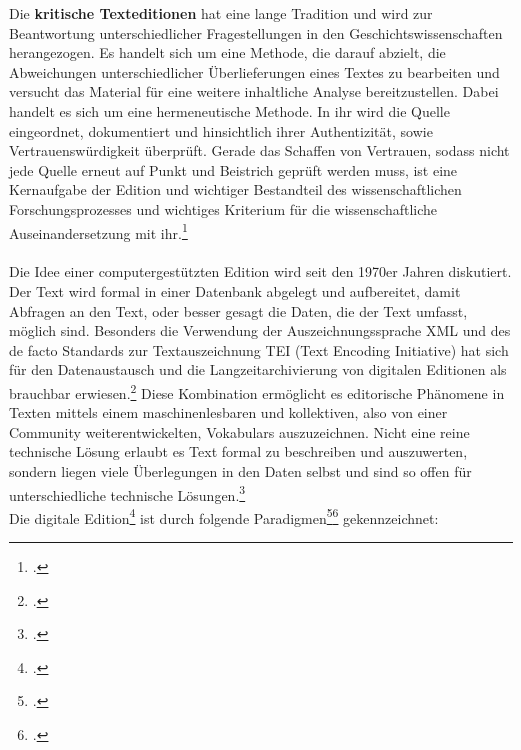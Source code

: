 \documentclass[12pt,a4paper]{article}
\begin{document}
Die \textbf{kritische Texteditionen} hat eine lange Tradition und wird zur Beantwortung unterschiedlicher Fragestellungen in den Geschichtswissenschaften herangezogen. Es handelt sich um eine Methode, die darauf abzielt, die Abweichungen unterschiedlicher Überlieferungen eines Textes zu bearbeiten und versucht das Material für eine weitere inhaltliche Analyse bereitzustellen. Dabei handelt es sich um eine hermeneutische Methode. In ihr wird die Quelle eingeordnet, dokumentiert und hinsichtlich ihrer Authentizität, sowie Vertrauenswürdigkeit überprüft. Gerade das Schaffen von Vertrauen, sodass nicht jede Quelle erneut auf Punkt und Beistrich geprüft werden muss, ist eine Kernaufgabe der Edition und wichtiger Bestandteil des wissenschaftlichen Forschungsprozesses und wichtiges Kriterium für die wissenschaftliche Auseinandersetzung mit ihr.\footcite[][S.101-144]{aumann1999digital}
\\
\\
Die Idee einer computergestützten Edition wird seit den 1970er Jahren diskutiert. Der Text wird formal in einer Datenbank abgelegt und aufbereitet, damit Abfragen an den Text, oder besser gesagt die Daten, die der Text umfasst, möglich sind. Besonders die Verwendung der Auszeichnungssprache XML und des de facto Standards zur Textauszeichnung TEI (Text Encoding Initiative) hat sich für den Datenaustausch und die Langzeitarchivierung von digitalen Editionen als brauchbar erwiesen.\footcite{burnard2014text} Diese Kombination ermöglicht es editorische Phänomene in Texten mittels einem maschinenlesbaren und kollektiven, also von einer Community weiterentwickelten, Vokabulars auszuzeichnen. Nicht eine reine technische Lösung erlaubt es Text formal zu beschreiben und auszuwerten, sondern liegen viele Überlegungen in den Daten selbst und sind so offen für unterschiedliche technische Lösungen.\footcite[][S.180-181]{vogeler2018religion}
\\
Die digitale Edition\footcite[Zu diesem Thema siehe auch:][]{pierazzo2016digital} ist durch folgende Paradigmen\footcite[][S.240-241]{sahle2017dhedition}\footcite[][S.102-108]{ScholgerMartina2018AadS} gekennzeichnet:
\end{document}
